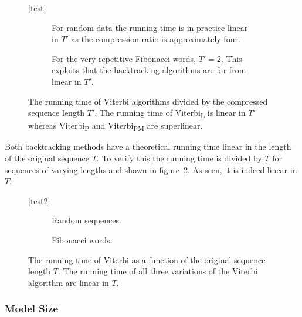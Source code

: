 \begin{figure}
  \centering\ref{test}
  \begin{subfigure}[b]{0.5\textwidth}
    \centering 
    \captionsetup{margin=10pt}
    \caption{For random data the running time is in practice linear in $T'$ as
      the compression ratio is approximately four.}
  \end{subfigure}%
  \begin{subfigure}[b]{0.5\textwidth}
    \centering 
    \captionsetup{margin=10pt}
    \caption{For the very repetitive Fibonacci words, $T' = 2$. This exploits
      that the backtracking algorithms are far from linear in $T'$.}
  \end{subfigure}
  \caption{The running time of Viterbi algorithms divided by the compressed
    sequence length $T'$. The running time of Viterbi\textsubscript{L} is
    linear in $T'$ whereas Viterbi\textsubscript{P} and
    Viterbi\textsubscript{PM} are superlinear.}
  \label{fig:assymptotic_viterbi_T}
\end{figure}

Both backtracking methods have a theoretical running time linear in the length
of the original sequence $T$. To verify this the running time is divided by $T$
for sequences of varying lengths and shown in
figure~\ref{fig:assymptotic_viterbi_backtrack_T}. As seen, it is indeed linear
in $T$.

\begin{figure}
  \centering\ref{test2}
  \begin{subfigure}[b]{0.5\textwidth}
    \centering 
    \caption{Random sequences.}
  \end{subfigure}%
  \begin{subfigure}[b]{0.5\textwidth}
    \centering 
    \caption{Fibonacci words.}
  \end{subfigure}
  \caption{The running time of Viterbi as a function of the original sequence
    length $T$. The running time of all three variations of the Viterbi
    algorithm are linear in $T$.}
  \label{fig:assymptotic_viterbi_backtrack_T}
\end{figure}

\subsubsection{Model Size}

